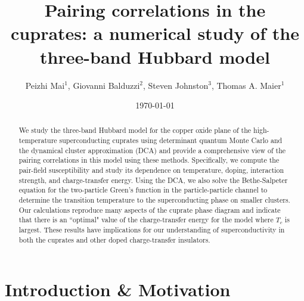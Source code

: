 \documentclass[reprint,nofootinbib,nobibnotes,amsmath,amssymb,aps,prb,floatfix]{revtex4-2}
\newcommand{\tJ}{$t$-$t'$-$J$ \ }
\begin{document}
\title{Pairing correlations in the cuprates: a numerical study of the three-band Hubbard model}
\author{ Peizhi Mai$^{1}$,  Giovanni Balduzzi$^{2}$, Steven Johnston$^{3}$, Thomas A. Maier$^{1}$ }
\date{\today}



\begin{abstract}
We study the three-band Hubbard model for the copper oxide plane of the high-temperature superconducting cuprates using determinant quantum Monte Carlo and the dynamical cluster approximation (DCA) and provide a comprehensive view of the pairing correlations in this model using these methods. Specifically, we compute the pair-field susceptibility and study its dependence on temperature, doping, interaction strength, and charge-transfer energy. Using the DCA, we also solve the Bethe-Salpeter equation for the two-particle Green's function in the particle-particle channel to determine the transition temperature to the superconducting phase on smaller clusters. Our calculations reproduce many aspects of the cuprate phase diagram and indicate that there is an ``optimal" value of the charge-transfer energy for the model where $T_c$ is largest. These results have implications for our understanding of superconductivity in both the cuprates and other doped charge-transfer insulators. 
\end{abstract}
\pacs{}
\maketitle

\section{Introduction \& Motivation}
\end{document}
